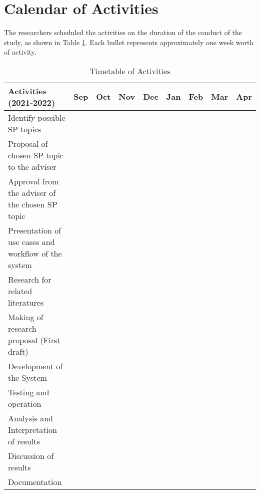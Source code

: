 \section{Calendar of Activities}

The researchers scheduled the activities on the duration of the conduct of the study, as shown in Table \ref{tab:timetableactivities}. Each bullet represents approximately one week worth of activity.

%
%
\newcommand{\weekone}{\textbullet}
\newcommand{\weektwo}{\textbullet \textbullet}
\newcommand{\weekthree}{\textbullet \textbullet \textbullet}
\newcommand{\weekfour}{\textbullet \textbullet \textbullet \textbullet}

%
%
\begin{comment}
   \newcommand{\weekone}{$\star$}
   \newcommand{\weektwo}{$\star \star$}
   \newcommand{\weekthree}{$\star \star \star$}
   \newcommand{\weekfour}{$\star \star \star \star$ }
\end{comment}



\begin{table}[ht]   %
\centering
\caption{Timetable of Activities} \vspace{0.25em}
\begin{tabular}{|p{1.8in}|c|c|c|c|c|c|c|c|} \hline
\centering Activities (2021-2022) & Sep   & Oct & Nov & Dec & Jan & Feb & Mar & Apr \\ \hline
Identify possible SP topics      &  \weekone  &  &  &  &  &  &  & \\ \hline
Proposal of chosen SP topic to the adviser &  & \weekone &  &  &  &  &  & \\ \hline
Approval from the adviser of the chosen SP topic       &  & \weekone &  &  &  &  &  & \\ \hline
Presentation of use cases and workflow of the system    &   & \weekone &  &  &  &  &  & \\ \hline
Research for related literatures  &   & \weekone & \weekfour &  &  &  &  & \\ \hline
Making of research proposal (First draft) & \weekone  & \weekfour & \weekone  &  &  &  &  & \\ \hline
Development of the System &  & \weekone & \weekfour & \weektwo & \weektwo & \weekfour &  & \\ \hline
Testing and operation &  &  &  & \weektwo &  &  & \weekfour & \\ \hline
Analysis and Interpretation of results &   &  &  &  &  & \weekfour & \weekfour & \\ \hline
Discussion of results &  &  &  & \weekfour &  & & \weekfour & \weekfour \\ \hline
Documentation & \weekone  & \weekfour & \weekfour & \weekfour & \weekfour & \weekfour & \weekfour & \weekfour \\ \hline
\end{tabular}
\label{tab:timetableactivities}
\end{table}

